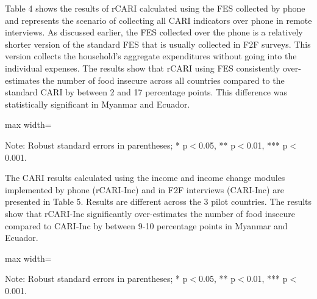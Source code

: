 \documentclass[11pt,harvard]{article}
\begin{document}
Table 4 shows the results of rCARI calculated using the FES collected by phone and represents the scenario of collecting all CARI indicators over phone in remote interviews. As discussed earlier, the FES collected over the phone is a relatively shorter version of the standard FES that is usually collected in F2F surveys. This version collects the household’s aggregate expenditures without going into the individual expenses. The results show that rCARI using FES consistently over-estimates the number of food insecure across all countries compared to the standard CARI by between 2 and 17 percentage points. This difference was statistically significant in Myanmar and Ecuador.

	\begin{table}[htbp]
		\centering
		\begin{adjustbox}{max width=\textwidth}
			\begin{threeparttable}
				\caption{Impact of Survey Modality: CARI-FES vs. rCARI-FES}
				\scriptsize
				 
				\label{tab:CARI_FES_rCARI_Modality_All_Country}
				\begin{tablenotes}
					\item Note: Robust standard errors in parentheses; * p$<$0.05, ** p$<$0.01, *** p$<$0.001. 
				\end{tablenotes}
			\end{threeparttable}
		\end{adjustbox}
	\end{table}
	
The CARI results calculated using the income and income change modules implemented by phone (rCARI-Inc) and in F2F interviews (CARI-Inc) are presented in Table 5. Results are different across the 3 pilot countries. The results show that rCARI-Inc significantly over-estimates the number of food insecure compared to CARI-Inc by between 9-10 percentage points in Myanmar and Ecuador.	
	
	\begin{table}[htbp]
		\centering
		\begin{adjustbox}{max width=\textwidth}
			\begin{threeparttable}
				\caption{Impact of Survey Modality: CARI-Inc vs. rCARI-Inc}
				\scriptsize
				 
				\label{tab:Inc_CARI_rCARI_Modality_All_Country}
				\begin{tablenotes}
					\item Note: Robust standard errors in parentheses; * p$<$0.05, ** p$<$0.01, *** p$<$0.001. 
				\end{tablenotes}
			\end{threeparttable}
		\end{adjustbox}
	\end{table}
	
\end{document}
